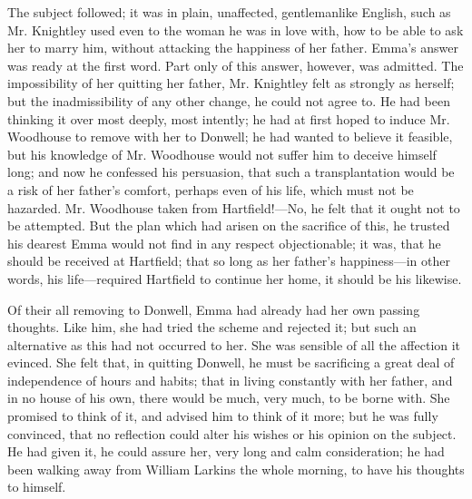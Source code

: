 
The subject followed; it was in plain, unaffected, gentlemanlike English, such as Mr. Knightley used even to the woman he was in love with, how to be able to ask her to marry him, without attacking the happiness of her father. Emma's answer was ready at the first word.  Part only of this answer, however, was admitted. The impossibility of her quitting her father, Mr. Knightley felt as strongly as herself; but the inadmissibility of any other change, he could not agree to. He had been thinking it over most deeply, most intently; he had at first hoped to induce Mr. Woodhouse to remove with her to Donwell; he had wanted to believe it feasible, but his knowledge of Mr. Woodhouse would not suffer him to deceive himself long; and now he confessed his persuasion, that such a transplantation would be a risk of her father's comfort, perhaps even of his life, which must not be hazarded. Mr. Woodhouse taken from Hartfield!---No, he felt that it ought not to be attempted. But the plan which had arisen on the sacrifice of this, he trusted his dearest Emma would not find in any respect objectionable; it was, that he should be received at Hartfield; that so long as her father's happiness---in other words, his life---required Hartfield to continue her home, it should be his likewise.

Of their all removing to Donwell, Emma had already had her own passing thoughts. Like him, she had tried the scheme and rejected it; but such an alternative as this had not occurred to her. She was sensible of all the affection it evinced. She felt that, in quitting Donwell, he must be sacrificing a great deal of independence of hours and habits; that in living constantly with her father, and in no house of his own, there would be much, very much, to be borne with. She promised to think of it, and advised him to think of it more; but he was fully convinced, that no reflection could alter his wishes or his opinion on the subject. He had given it, he could assure her, very long and calm consideration; he had been walking away from William Larkins the whole morning, to have his thoughts to himself.

